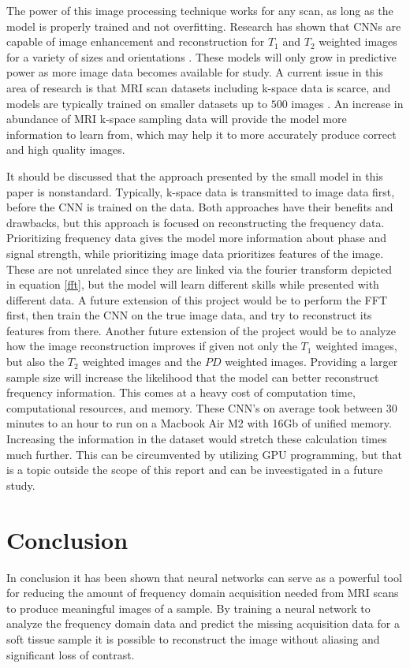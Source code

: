 \documentclass[14pt]{extreport}
\begin{document}
        The power of this image processing technique works for any scan, as long as the model is properly trained and not overfitting. Research has shown that CNNs are capable of image enhancement and reconstruction for $T_1$ and $T_2$ weighted images for a variety of sizes and orientations \cite{Wang_Su_Ying_Peng_Zhu_Liang_Feng_Liang_2016}. These models will only grow in predictive power as more image data becomes available for study. A current issue in this area of research is that MRI scan datasets including k-space data is scarce, and models are typically trained on smaller datasets up to $500$ images \cite{Wang_Su_Ying_Peng_Zhu_Liang_Feng_Liang_2016}. An increase in abundance of MRI k-space sampling data will provide the model more information to learn from, which may help it to more accurately produce correct and high quality images.

        It should be discussed that the approach presented by the small model in this paper is nonstandard. Typically, k-space data is transmitted to image data first, before the CNN is trained on the data. Both approaches have their benefits and drawbacks, but this approach is focused on reconstructing the frequency data. Prioritizing frequency data gives the model more information about phase and signal strength, while prioritizing image data prioritizes features of the image. These are not unrelated since they are linked via the fourier transform depicted in equation \eqref{fft}, but the model will learn different skills while presented with different data. A future extension of this project would be to perform the FFT first, then train the CNN on the true image data, and try to reconstruct its features from there. Another future extension of the project would be to analyze how the image reconstruction improves if given not only the $T_1$ weighted images, but also the $T_2$ weighted images and the $PD$ weighted images. Providing a larger sample size will increase the likelihood that the model can better reconstruct frequency information. This comes at a heavy cost of computation time, computational resources, and memory. These CNN's on average took between 30 minutes to an hour to run on a Macbook Air M2 with 16Gb of unified memory. Increasing the information in the dataset would stretch these calculation times much further. This can be circumvented by utilizing GPU programming, but that is a topic outside the scope of this report and can be inveestigated in a future study.
    
    \section*{Conclusion}
        In conclusion it has been shown that neural networks can serve as a powerful tool for reducing the amount of frequency domain acquisition needed from MRI scans to produce meaningful images of a sample. By training a neural network to analyze the frequency domain data and predict the missing acquisition data for a soft tissue sample it is possible to reconstruct the image without aliasing and significant loss of contrast. 
\end{document}
